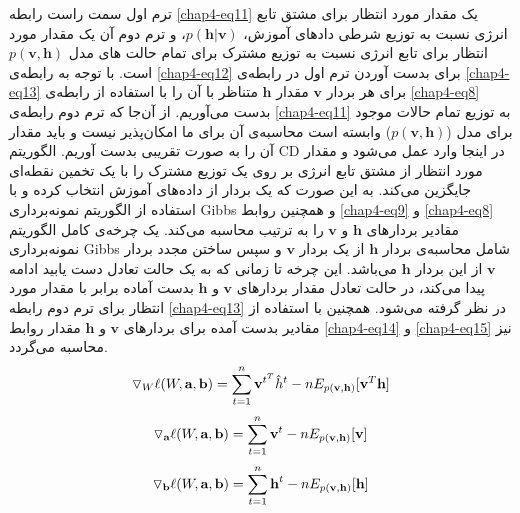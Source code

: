 ترم اول سمت راست رابطه
\ref{chap4-eq11}
یک مقدار مورد انتظار برای مشتق تابع انرژی نسبت به توزیع شرطی دادهای آموزش،
$p(\textbf{h}|\textbf{v})$،
و ترم دوم آن یک مقدار مورد انتظار برای تابع انرژی نسبت به توزیع مشترک برای تمام حالت های  مدل
$p(\textbf{v},\textbf{h})$
 است. با توجه به رابطه‌ی
\ref{chap4-eq12}
برای بدست آوردن ترم اول در رابطه‌ی
\ref{chap4-eq13}
برای هر بردار
$\textbf{v}$
مقدار
$\textbf{h}$
متناظر با آن را با استفاده از رابطه‌ی
\ref{chap4-eq8}
بدست می‌‌آوریم. از آن‌جا که ترم دوم رابطه‌ی
\ref{chap4-eq11}
به توزیع تمام حالات موجود برای مدل
($p(\textbf{v},\textbf{h})$)
وابسته است محاسبه‌ی آن برای ما امکان‌پذیر نیست و باید مقدار آن را به صورت تقریبی بدست آوریم. الگوریتم
CD
در اینجا وارد عمل می‌شود و مقدار مورد انتظار از مشتق تابع انرژی بر روی یک توزیع مشترک را با یک تخمین نقطه‌ای جایگزین می‌‌کند. به این صورت که یک بردار از داده‌های آموزش انتخاب کرده و با استفاده از الگوریتم نمونه‌برداری
Gibbs
و همچنین روابط
\ref{chap4-eq9}
و
\ref{chap4-eq8}
مقادیر بردار‌های
$\textbf{h}$
و
$\textbf{v}$
را به ترتیب محاسبه می‌کند. یک چرخه‌‌ی کامل الگوریتم نمونه‌برداری
Gibbs
شامل محاسبه‌ی بردار
$\textbf{h}$
از یک بردار
$\textbf{v}$
و سپس ساختن مجدد بردار
$\textbf{v}$
از این بردار
$\textbf{h}$
می‌باشد. این چرخه تا زمانی که به یک حالت تعادل دست یابید ادامه پیدا می‌کند، در حالت تعادل مقدار بردارهای
$\textbf{v}$
و
$\textbf{h}$
بدست آماده برابر با مقدار مورد انتظار برای ترم دوم رابطه
\ref{chap4-eq13}
در نظر گرفته می‌‌شود. همچنین با استفاده از مقادیر بدست آمده برای بردارهای
$\textbf{v}$
و
$\textbf{h}$
مقدار روابط
\ref{chap4-eq14}
و
\ref{chap4-eq15}
نیز محاسبه می‌‌گردد.
\begin{align}
	\centering
	\label{chap4-eq13}
	\triangledown_W \ell(W, \textbf{a}, \textbf{b})=\sum_{t=1}^{n} \textbf{v}^{t^T} \hat{h}^t - nE_{p(\textbf{v},\textbf{h})}[\textbf{v}^T\textbf{h}]
\end{align}
\begin{align}
	\centering
	\label{chap4-eq14}
	\triangledown_{\textbf{a}} \ell(W, \textbf{a}, \textbf{b})=\sum_{t=1}^{n} \textbf{v}^{t} - nE_{p(\textbf{v},\textbf{h})}[\textbf{v}] 
\end{align}
\begin{align}
	\centering
	\label{chap4-eq15}
	\triangledown_{\textbf{b}} \ell(W, \textbf{a}, \textbf{b})=\sum_{t=1}^{n} \textbf{h}^{t} - nE_{p(\textbf{v},\textbf{h})}[\textbf{h}] 
\end{align}

